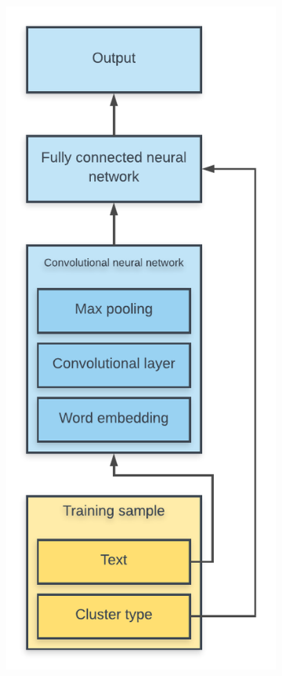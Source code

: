 \begin{figure}[htbp]
  \centering
  \begin{subfigure}[b]{0.45\textwidth}
    \includegraphics[width=\textwidth]{figures/nn_layout.pdf}

\end{subfigure}
\end{figure}
